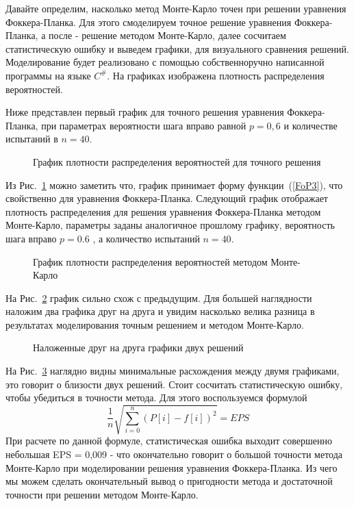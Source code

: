 \documentclass[a4paper]{report}
\begin{document}
Давайте определим, насколько метод Монте-Карло точен при решении уравнения Фоккера-Планка. Для этого смоделируем точное решение уравнения Фоккера-Планка, а после - решение методом Монте-Карло, далее сосчитаем статистическую ошибку и выведем графики, для визуального сравнения решений.
Моделирование будет реализовано с помощью собственноручно написанной программы на языке $C^\#$.
На графиках изображена плотность распределения вероятностей.

Ниже представлен первый график для точного решения уравнения Фоккера-Планка, при параметрах вероятности шага вправо равной $p=0,6$ и количестве испытаний в $n=40$.

\begin{figure}[!h]
\center{\texttt{[image: fp1]}}
\caption{График плотности распределения вероятностей для точного решения}
\label{ris2}
\end{figure}

  Из Рис.~\ref{ris2} можно заметить что, график принимает форму функции~(\ref{FoP3}), что свойственно для уравнения Фоккера-Планка.
Следующий график отображает плотность распределения для решения уравнения Фоккера-Планка методом Монте-Карло, параметры заданы аналогичное прошлому графику, вероятность шага вправо $p=0.6$ , а количество испытаний $n=40$.

\vspace{2.0cm}

\begin{figure}[!h]
\center{\texttt{[image: mk1]}}
\caption{График плотности распределения вероятностей методом Монте-Карло}
\label{ris3}
\end{figure}

На Рис.~\ref{ris3} график сильно схож с предыдущим. Для большей наглядности наложим два графика друг на друга и увидим насколько велика разница в результатах моделирования точным решением и методом Монте-Карло.

\vspace{2.0cm}

\begin{figure}[!h]
\caption{Наложенные друг на друга графики двух решений}
\label{ris4}
\end{figure}

На Рис.~\ref{ris4} наглядно видны минимальные расхождения между двумя графиками, это говорит о близости двух решений. Стоит сосчитать статистическую ошибку, чтобы убедиться в точности метода.
Для этого воспользуемся формулой
\begin{equation}
{\frac{1}{n}}\sqrt{\sum\limits_{i=0}^n (P[i] - f[i])^2} = EPS
\end{equation}
При расчете по данной формуле, статистическая ошибка выходит совершенно небольшая EPS = 0,009 - что окончательно говорит о большой точности метода Монте-Карло при моделировании решения уравнения Фоккера-Планка. Из чего мы можем сделать окончательный вывод о пригодности метода и достаточной точности при решении методом Монте-Карло.
\end{document}

